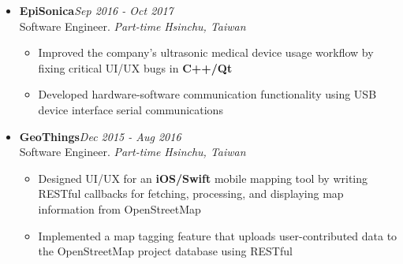 \begin{itemize}[leftmargin=0pt, label={}]
\item{
{\sectionheading\large{\textbf{EpiSonica}}}\hfill {\sectionheading\small{\textit{Sep 2016 - Oct 2017}}}\\
{\sectionheading\small{Software Engineer. \textit{Part-time}}}\hfill
{\sectionheading\small{\textit{Hsinchu, Taiwan}}}

    \vspace{-6pt}
    \begin{itemize}[label=\textbullet, leftmargin=*, noitemsep]%
        \item{Improved the company's ultrasonic medical device usage workflow by fixing critical UI/UX bugs in \textbf{C++/Qt}}
        \item{Developed hardware-software communication functionality using USB device interface serial communications}
    \end{itemize}
}

\item{
{\sectionheading\large{\textbf{GeoThings}}}\hfill {\sectionheading\small{\textit{Dec 2015 - Aug 2016}}}\\
{\sectionheading\small{Software Engineer. \textit{Part-time}}}\hfill
{\sectionheading\small{\textit{Hsinchu, Taiwan}}}

    \vspace{-6pt}
    \begin{itemize}[label=\textbullet, leftmargin=*, noitemsep]%
        \item{Designed UI/UX for an \textbf{iOS/Swift} mobile mapping tool by writing RESTful callbacks for fetching, processing, and displaying map information from OpenStreetMap}
        \item{Implemented a map tagging feature that uploads user-contributed data to the OpenStreetMap project database using RESTful}
    \end{itemize}
}
\end{itemize}
